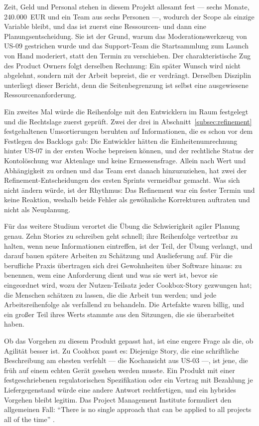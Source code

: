 Zeit, Geld und Personal stehen in diesem Projekt allesamt fest --- sechs Monate,
240.000~EUR und ein Team aus sechs Personen ---, wodurch der Scope als einzige
Variable bleibt, und das ist zuerst eine Ressourcen- und dann eine
Planungsentscheidung. Sie ist der Grund, warum das Moderationswerkzeug von US-09
gestrichen wurde und das Support-Team die Startsammlung zum Launch von Hand
moderiert, statt den Termin zu verschieben. Der charakteristische Zug des Product
Owners folgt derselben Rechnung: Ein später Wunsch wird nicht abgelehnt, sondern
mit der Arbeit bepreist, die er verdrängt. Derselben Disziplin unterliegt dieser
Bericht, denn die Seitenbegrenzung ist selbst eine ausgewiesene
Ressourcenanforderung.

Ein zweites Mal würde die Reihenfolge mit den Entwicklern im Raum festgelegt und
die Rechtslage zuerst geprüft. Zwei der drei in Abschnitt~\ref{subsec:refinement}
festgehaltenen Umsortierungen beruhten auf Informationen, die es schon vor dem
Festlegen des Backlogs gab: Die Entwickler hätten die Einheitenumrechnung hinter
US-07 in der ersten Woche bepreisen können, und der rechtliche Status der
Kontolöschung war Aktenlage und keine Ermessensfrage. Allein nach Wert und
Abhängigkeit zu ordnen und das Team erst danach hinzuzuziehen, hat zwei der
Refinement-Entscheidungen des ersten Sprints vermeidbar gemacht. Was sich nicht
ändern würde, ist der Rhythmus: Das Refinement war ein fester Termin und keine
Reaktion, weshalb beide Fehler als gewöhnliche Korrekturen auftraten und nicht
als Neuplanung.

Für das weitere Studium verortet die Übung die Schwierigkeit agiler Planung
genau. Zehn Stories zu schreiben geht schnell; ihre Reihenfolge vertretbar zu
halten, wenn neue Informationen eintreffen, ist der Teil, der Übung verlangt, und
darauf bauen spätere Arbeiten zu Schätzung und Auslieferung auf. Für die
berufliche Praxis übertragen sich drei Gewohnheiten über Software hinaus: zu
benennen, wem eine Anforderung dient und was sie wert ist, bevor sie eingeordnet
wird, wozu der Nutzen-Teilsatz jeder Cookbox-Story gezwungen hat; die Menschen
schätzen zu lassen, die die Arbeit tun werden; und jede Arbeitsreihenfolge als
verfallend zu behandeln. Die Artefakte waren billig, und ein großer Teil ihres
Werts stammte aus den Sitzungen, die sie überarbeitet haben.

Ob das Vorgehen zu diesem Produkt gepasst hat, ist eine engere Frage als die, ob
Agilität besser ist. Zu Cookbox passt es: Diejenige Story, die eine schriftliche
Beschreibung am ehesten verfehlt --- die Kochansicht aus US-03 ---, ist jene, die
früh auf einem echten Gerät gesehen werden musste. Ein Produkt mit einer
festgeschriebenen regulatorischen Spezifikation oder ein Vertrag mit
Bezahlung je Liefergegenstand würde eine andere Antwort rechtfertigen, und ein
hybrides Vorgehen bleibt legitim. Das Project Management Institute formuliert den
allgemeinen Fall:
\enquote{There is no single approach that can be applied to all projects all of
the time} \parencite[PMBOK Guide, Section~3.2]{pmbok2021}.


